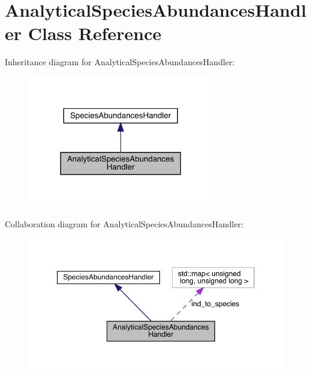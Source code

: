 \hypertarget{class_analytical_species_abundances_handler}{}\section{Analytical\+Species\+Abundances\+Handler Class Reference}
\label{class_analytical_species_abundances_handler}


Inheritance diagram for Analytical\+Species\+Abundances\+Handler\+:
\nopagebreak
\begin{figure}[H]
\begin{center}
\leavevmode
\includegraphics[width=230pt]{class_analytical_species_abundances_handler__inherit__graph}
\end{center}
\end{figure}


Collaboration diagram for Analytical\+Species\+Abundances\+Handler\+:
\nopagebreak
\begin{figure}[H]
\begin{center}
\leavevmode
\includegraphics[width=350pt]{class_analytical_species_abundances_handler__coll__graph}
\end{center}
\end{figure}
